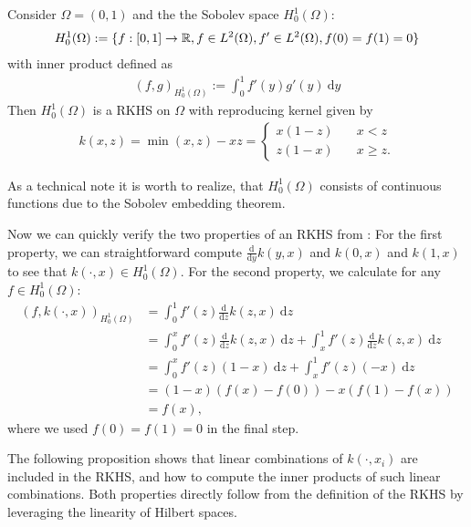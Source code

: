 \begin{example}
Consider $\Omega = (0, 1)$ and the the Sobolev space $H_0^1(\Omega)$:
\begin{align*}
H_0^1(\Omega) := \{ f: [0, 1] \rightarrow \mathbb{R}, f \in L^2(\Omega), f' \in L^2(\Omega), f(0) = f(1) = 0 \}
\end{align*}
with inner product defined as
\begin{align*}
(f, g)_{H_0^1(\Omega)} := \int_0^1 f'(y) g'(y) ~ \mathrm{d}y
\end{align*}
Then $H_0^1(\Omega)$ is a RKHS on $\Omega$ with reproducing kernel given by
\begin{align*}
k(x, z) = \min(x, z) - xz = 
\begin{cases}
x(1-z) & \quad x < z \\
z(1-x) & \quad x \geq z.
\end{cases}
\end{align*}

As a technical note it is worth to realize, that $H_0^1(\Omega)$ consists of continuous functions due to the Sobolev embedding theorem.

Now we can quickly verify the two properties of an RKHS from : 
For the first property, we can straightforward compute $\frac{\mathrm{d}}{\mathrm{d}y} k(y, x)$ and $k(0, x)$ and $k(1, x)$ to see that $k(\cdot, x) \in H_0^1(\Omega)$.
For the second property, we calculate for any $f \in H_0^1(\Omega)$:
\begin{align*}
(f, k(\cdot, x))_{H_0^1(\Omega)} &= \int_0^1 f'(z) \frac{\mathrm{d}}{\mathrm{d}z} k(z, x) ~ \mathrm{d}z \\
&= \int_0^x f'(z) \frac{\mathrm{d}}{\mathrm{d}z} k(z, x) ~ \mathrm{d}z + \int_x^1 f'(z) \frac{\mathrm{d}}{\mathrm{d}z} k(z, x) ~ \mathrm{d}z \\
&= \int_0^x f'(z) (1-x) ~ \mathrm{d}z + \int_x^1 f'(z) (-x) ~ \mathrm{d}z \\
&= (1-x) (f(x) - f(0)) - x (f(1) - f(x)) \\
&= f(x),
\end{align*}
where we used $f(0) = f(1) = 0$ in the final step.
\end{example}

The following proposition shows that linear combinations of $k(\cdot, x_i)$ are included in the RKHS, and how to compute the inner products of such linear combinations. 
Both properties directly follow from the definition of the RKHS by leveraging the linearity of Hilbert spaces.

